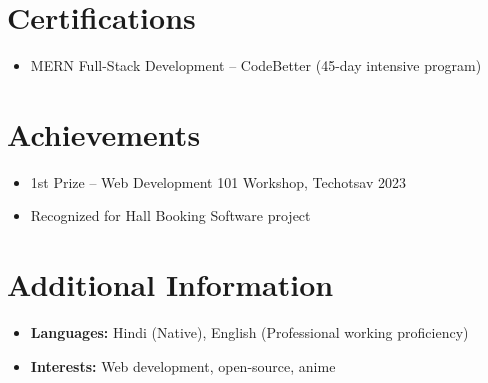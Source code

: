 \documentclass[letterpaper,11pt]{article}
\newcommand{\resumeItem}[1]{
  \item\small{\color{bodycolor} #1 \vspace{-2pt}}
}
\newcommand{\resumeSubHeadingListStart}{\begin{itemize}[leftmargin=0.0in, label={}]}
\newcommand{\resumeSubHeadingListEnd}{\end{itemize}}
\begin{document}
\section{Certifications}
\resumeSubHeadingListStart
  \resumeItem{MERN Full-Stack Development -- CodeBetter (45-day intensive program)}
\resumeSubHeadingListEnd

\section{Achievements}
\resumeSubHeadingListStart
  \resumeItem{1st Prize -- Web Development 101 Workshop, Techotsav 2023}
  \resumeItem{Recognized for Hall Booking Software project}
\resumeSubHeadingListEnd

\section{Additional Information}
\resumeSubHeadingListStart
  \item \textbf{Languages:} Hindi (Native), English (Professional working proficiency)
  \item \textbf{Interests:} Web development, open-source, anime
\resumeSubHeadingListEnd
\end{document}
